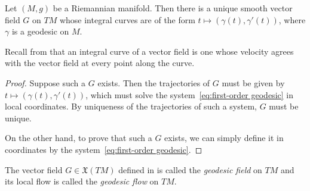 \begin{theorem}\label{thm:geodesic field}
	Let $(M,g)$ be a Riemannian manifold. Then there is a unique smooth vector field $G$ on $TM$ whose integral curves are of the form $t \mapsto (\gamma(t), \gamma'(t))$, where $\gamma$ is a geodesic on $M$.
\end{theorem}

Recall from  that an integral curve of a vector field is one whose velocity agrees with the vector field at every point along the curve.

\begin{proof}
	Suppose such a $G$ exists. Then the trajectories of $G$ must be given by $t \mapsto (\gamma(t), \gamma'(t))$, which must solve the system~\eqref{eq:first-order geodesic} in local coordinates. By uniqueness of the trajectories of such a system, $G$ must be unique.
	
	On the other hand, to prove that such a $G$ exists, we can simply define it in coordinates by the system~\eqref{eq:first-order geodesic}.
\end{proof}

\begin{definition}\label{def:geodesic field}
	The vector field $G \in \mathfrak{X}(TM)$ defined in  is called the \emph{geodesic field} on $TM$ and its local flow is called the \emph{geodesic flow} on $TM$.
\end{definition}

